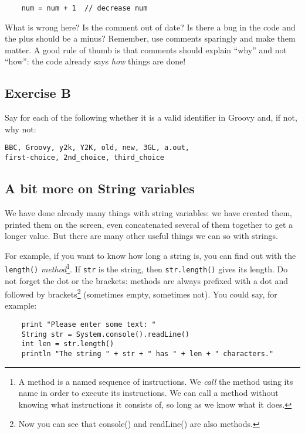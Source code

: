 \begin{verbatim}
    num = num + 1  // decrease num
\end{verbatim}

What is wrong here? Is the comment out of date? Is there a bug in the
code and the plus should be a minus? Remember, use comments sparingly
and make them matter. A good rule of thumb is that comments should
explain ``why'' and not ``how'': the code already says \emph{how}
things are done! 

\subsection*{Exercise B}

Say for each of the following whether it is a valid identifier
in Groovy and, if not, why not:
\begin{Verbatim}
BBC, Groovy, y2k, Y2K, old, new, 3GL, a.out, 
first-choice, 2nd_choice, third_choice
\end{Verbatim}

\subsection{A bit more on String variables}

We have done already many things with string variables: we have
created them, printed them on the screen, even concatenated several of
them together to get a longer value. But there are many other useful
things we can so with strings. 

For example, if you want to know how long a string is, you can find
out with the \verb!length()! 
{\em method}\footnote{A method is a named sequence of instructions. We 
{\em call} the method using its name in order to execute its instructions.
We can call a method without knowing what instructions it consists of, so
long as we know what it does.}. 
If  \verb!str! is the string, then \verb!str.length()! gives its 
length. Do not forget the dot or the brackets: methods are always 
prefixed with a dot and followed by brackets\footnote{Now you can see that
  console() and readLine() are also methods.} (sometimes empty,
sometimes not). You could say, for example:

\begin{Verbatim}
    print "Please enter some text: "
    String str = System.console().readLine()
    int len = str.length()
    println "The string " + str + " has " + len + " characters."
\end{Verbatim}

